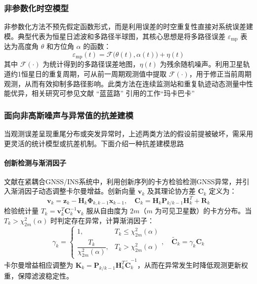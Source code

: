 \subsubsection{非参数化时空模型}
非参数化方法不预先假定函数形式，而是利用误差的时空重复性直接对系统误差建模。典型代表为恒星日滤波和多路径半球图，其核心思想是将多路径误差 $\varepsilon_{\text{mp}}$ 表达为高度角 $\theta$ 和方位角 $\alpha$ 的函数：
\begin{equation}
\varepsilon_{\text{mp}}(t) = \mathcal{F}\big(\theta(t), \alpha(t)\big) + \eta(t)
\label{eq:mp_map}
\end{equation}
其中 $\mathcal{F}(\cdot)$ 为统计得到的多路径误差地图，$\eta(t)$ 为残余随机噪声。利用卫星轨道约1恒星日的重复周期，可从前一周期观测值中提取 $\mathcal{F}(\cdot)$，用于修正当前周期观测，从而有效抑制多路径影响。此类方法在连续监测站和重复轨迹动态测量中性能优异，相关研究可参见文献 “蓝蓝路”
引用的工作“玛卡巴卡”

\subsubsection{面向非高斯噪声与异常值的抗差建模}
当观测误差呈现重尾分布或突发异常时，上述两类方法的假设前提被破坏，需采用更灵活的统计模型或抗差机制。下面介绍一种抗差建模思路

\paragraph{创新检测与渐消因子}
文献\cite{8930069}在紧耦合GNSS/INS系统中，利用创新序列的卡方检验检测GNSS异常，并引入渐消因子动态调整卡尔曼增益。创新向量 $\mathbf{v}_k$ 及其理论协方差 $\mathbf{C}_k$ 定义为：
\begin{equation}
\mathbf{v}_k = \mathbf{z}_k - \mathbf{H}_k \mathbf{\Phi}_{k,k-1} \mathbf{x}_{k-1}, \quad
\mathbf{C}_k = \mathbf{H}_k \mathbf{P}_{k/k-1} \mathbf{H}_k^T + \mathbf{R}_k
\label{eq:innovation}
\end{equation}
检验统计量 $T_k = \mathbf{v}_k^T \mathbf{C}_k^{-1} \mathbf{v}_k$ 服从自由度为 $2m$（$m$ 为可见卫星数）的卡方分布。当 $T_k > \chi_{2m}^2(\alpha)$ 时判定存在异常，计算渐消因子：
\begin{equation}
\gamma_k = \begin{cases}
1, & T_k \leq \chi_{2m}^2(\alpha) \\[4pt]
\dfrac{T_k}{\chi_{2m}^2(\alpha)}, & T_k > \chi_{2m}^2(\alpha)
\end{cases}, \quad
\tilde{\mathbf{C}}_k = \gamma_k \mathbf{C}_k
\label{eq:fading_factor}
\end{equation}
卡尔曼增益相应调整为 $\mathbf{K}_k = \mathbf{P}_{k/k-1} \mathbf{H}_k^T \tilde{\mathbf{C}}_k^{-1}$，从而在异常发生时降低观测更新权重，保障滤波稳定性。

